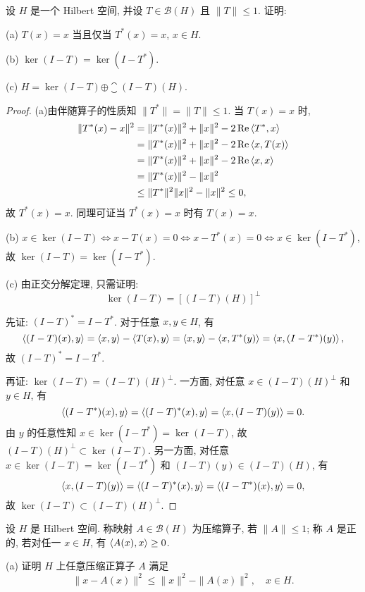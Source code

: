 \begin{exercise}
    设 $H$ 是一个 Hilbert 空间, 并设 $T\in\mathcal{B}(H)$ 且 $\|T\|\leq 1$. 证明:

    (a) $T(x)=x$ 当且仅当 $T^*(x)=x$, $x\in H$.

    (b) $\ker(I-T)=\ker(I-T^*)$.

    (c) $H=\ker(I-T)\oplus\closure{(I-T)(H)}$.
\end{exercise}

\begin{proof}
    (a)由伴随算子的性质知 $\|T^*\|=\|T\|\leq 1$. 当 $T(x)=x$ 时,
    \begin{align*}
        \|T^*(x)-x\|^2
        & =\|T^*(x)\|^2+\|x\|^2-2\operatorname{Re}\left\langle T^*,x\right\rangle \\
        & =\|T^*(x)\|^2+\|x\|^2-2\operatorname{Re}\left\langle x,T(x)\right\rangle \\
        & =\|T^*(x)\|^2+\|x\|^2-2\operatorname{Re}\left\langle x,x\right\rangle \\
        & =\|T^*(x)\|^2-\|x\|^2 \\
        & \leq\|T^*\|^2\|x\|^2-\|x\|^2\leq 0,
    \end{align*}
    故 $T^*(x)=x$. 同理可证当 $T^*(x)=x$ 时有 $T(x)=x$.

    (b) $x\in\ker(I-T)\Leftrightarrow x-T(x)=0\Leftrightarrow x-T^{*}(x)=0\Leftrightarrow x\in\ker(I-T^{*})$, 
    故 $\ker(I-T)=\ker(I-T^{*})$.

    (c) 由正交分解定理, 只需证明:
    \[\ker(I-T)=[(I-T)(H)]^{\perp}\]

    先证: $(I-T)^*=I-T^*$. 对于任意 $x,y\in H$, 有
    \[\left\langle(I-T)(x),y\right\rangle=\left\langle x,y\right\rangle-\left\langle T(x),y\right\rangle=\left\langle x,y\right\rangle-\left\langle x,T^*(y)\right\rangle=\left\langle x,(I-T^*)(y)\right\rangle,\]
    故 $(I-T)^*=I-T^*$.

    再证: $\ker(I-T)=(I-T)(H)^{\perp}$.
    一方面, 对任意 $x\in (I-T)(H)^{\perp}$ 和 $y\in H$, 有
    \[\left\langle(I-T^*)(x),y\right\rangle=\left\langle(I-T)^*(x),y\right\rangle=\left\langle x,(I-T)(y)\right\rangle=0.\]
    由 $y$ 的任意性知 $x\in\ker(I-T^*)=\ker(I-T)$, 故 $(I-T)(H)^{\perp}\subset\ker(I-T)$.
    另一方面, 对任意 $x\in\ker(I-T)=\ker(I-T^*)$ 和 $(I-T)(y)\in (I-T)(H)$, 有
    \[\left\langle x,(I-T)(y)\right\rangle=\left\langle(I-T)^*(x),y\right\rangle=\left\langle(I-T^*)(x),y\right\rangle=0,\]
    故 $\ker(I-T)\subset (I-T)(H)^{\perp}$.
\end{proof}



\begin{exercise}
    设 $H$ 是 Hilbert 空间. 称映射 $A\in\mathcal{B}(H)$ 为压缩算子, 若 $\|A\|\leq 1$;
    称 $A$ 是正的, 若对任一 $x\in H$, 有 $\left\langle A(x),x\right\rangle\geq 0$.

    (a) 证明 $H$ 上任意压缩正算子 $A$ 满足
    \[\|x-A(x)\|^2\leq\|x\|^2-\|A(x)\|^2,\quad x\in H.\]
\end{exercise}

